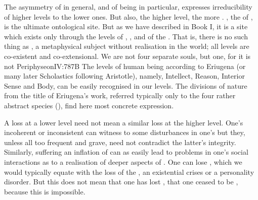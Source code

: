 \pa\label{noselfsense} The asymmetry of  in general,
 and of being  in particular, %
expresses irreducibility of higher levels to the lower ones. But also, the
higher level, the more .  , the  of , is
the ultimate ontological site.  But as we have described in Book I, it is a
 site which exists only through the levels of ,
,  and  of the .  That is, there
is no such thing as  , a metaphysical subject without
 realisation in the world; all levels are co-existent and
co-extensional. We are not four separate souls, but one, for it is not \citet{a
  diversity of parts -- if we have to assert that it has parts -- which is
  distinguished in the soul, but a variety of functions and
  movements.}{Periphyseon}{IV:787B\kilde{[p.111]}
  The levels of human being according to Eriugena (or many
  later Scholastics following Aristotle), namely, Intellect, Reason, Interior
  Sense and Body, can be  easily recognised in our levels.  The divisions of nature from the
title of Eriugena's work, referred typically only to the four rather abstract species
(), find here most concrete
expression.} 

A loss at a lower level need not mean a similar loss at the higher level. One's
incoherent or inconsistent  can witness to some disturbances in one's
 but they, unless all too frequent and grave, need not contradict the
latter's integrity. Similarly, suffering an inflation of  can as easily
lead to problems in one's social interactions as to a realisation of deeper
aspects of . One can lose , which we would typically
equate with the loss of the , an existential crises
or a personality disorder. But this does not mean that one has lost ,
that one ceased to be , because this is impossible.

